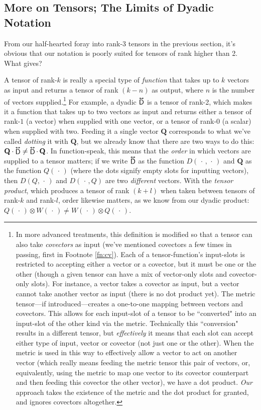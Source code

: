 \documentclass[12pt]{article}
\renewcommand{\vv}[1]{\mathbf{#1}}
\newcommand{\tightoverset}[2]{%
  \mathop{#2}\limits^{\vbox to -.5ex{\kern-0.75ex\hbox{$#1$}\vss}}}
\newcommand{\inlinedy}[1]{\tightoverset{\text{\tiny$\bm\leftrightarrow$}}{#1}}
\begin{document}
\subsection{More on Tensors; The Limits of Dyadic Notation}\label{ssec:index}

From our half-hearted foray into rank-3 tensors in the previous section, it's obvious that our notation is poorly suited for tensors of rank higher than 2. What gives?

A tensor of rank-$k$ is really a special type of \emph{function} that takes up to $k$ vectors as input and returns a tensor of rank $(k - n)$ as output, where $n$ is the number of vectors supplied.\footnote{\label{fn:ten}In more advanced treatments, this definition is modified so that a tensor can also take \emph{covectors} as input (we've mentioned covectors a few times in passing, first in Footnote \ref{fn:cv}). Each of a tensor-function's input-slots is restricted to accepting either a vector or a covector, but it must be one or the other (though a given tensor can have a mix of vector-only slots and covector-only slots). For instance, a vector takes a covector as input, but a vector cannot take another vector as input (there is no dot product yet). The metric tensor---if introduced---creates a one-to-one mapping between vectors and covectors. This allows for each input-slot of a tensor to be ``converted" into an input-slot of the other kind via the metric. Technically this ``conversion" results in a different tensor, but \emph{effectively} it means that each slot can accept either type of input, vector or covector (not just one or the other). When the metric is used in this way to effectively allow a vector to act on another vector (which really means feeding the metric tensor this pair of vectors, or, equivalently, using the metric to map one vector to its covector counterpart and then feeding this covector the other vector), we have a dot product. \emph{Our} approach takes the existence of the metric and the dot product for granted, and ignores covectors altogether.} For example, a dyadic $\inlinedy{\mathsf{D}}$ is a tensor of rank-2, which makes it a function that takes up to two vectors as input and returns either a tensor of rank-$1$ (a vector) when supplied with one vector, or a tensor of rank-$0$ (a scalar) when supplied with two. Feeding it a single vector $\vv Q$ corresponds to what we've called \emph{dotting} it with $\vv Q$, but we already know that there are two ways to do this: $\vv Q \cdot \inlinedy{\mathsf{D}} \neq \inlinedy{\mathsf{D}} \cdot \, \vv Q$. In function-speak, this means that the \emph{order} in which vectors are supplied to a tensor matters; if we write $\inlinedy{\mathsf{D}}$ as the function $D(\, \cdot \, , \, \cdot \,)$ and $\vv Q$ as the function $Q(\, \cdot \, )$ (where the dots signify empty slots for inputting vectors), then $D(Q, \, \cdot \,)$ and $D(\, \cdot \, , Q)$ are two \emph{different} vectors. With the \emph{tensor product}, which produces a tensor of rank $(k + l)$ when taken between tensors of rank-$k$ and rank-$l$, order likewise matters, as we know from our dyadic product: $Q(\, \cdot \, ) \otimes W(\, \cdot \, ) \neq W(\, \cdot \, ) \otimes Q(\, \cdot \, )$.
\end{document}
